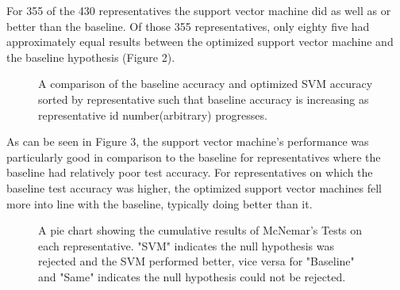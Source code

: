 \documentclass[11pt,letterpaper,twocolumn]{article}
\begin{document}
For 355 of the 430 representatives the support vector machine did as well as or better than the baseline. Of those 355 representatives, only eighty five had approximately equal results between the optimized support vector machine and the baseline hypothesis (Figure 2).

\begin{figure}[t]
\centering
{}
\caption{A comparison of the baseline accuracy and optimized SVM accuracy sorted by representative such that baseline accuracy is increasing as representative id number(arbitrary) progresses.}
\end{figure}

As can be seen in Figure 3, the support vector machine's performance was particularly good in comparison to the baseline for representatives where the baseline had relatively poor test accuracy. For representatives on which the baseline test accuracy was higher, the optimized support vector machines fell more into line with the baseline, typically doing better than it.

\begin{figure}
\centering
{}
\caption{A pie chart showing the cumulative results of McNemar's Tests on each representative. "SVM" indicates the null hypothesis was rejected and the SVM performed better, vice versa for "Baseline" and "Same" indicates the null hypothesis could not be rejected.}
\end{figure}
\end{document}
